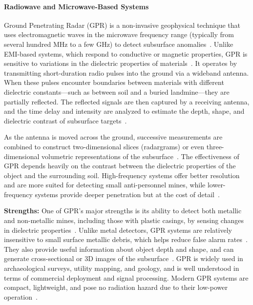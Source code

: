 
\paragraph{Radiowave and Microwave-Based Systems}

Ground Penetrating Radar (GPR) is a non-invasive geophysical technique that uses electromagnetic waves in the microwave frequency range (typically from several hundred MHz to a few GHz) to detect subsurface anomalies~\cite{gichd2006guidebook}. Unlike EMI-based systems, which respond to conductive or magnetic properties, GPR is sensitive to variations in the dielectric properties of materials~\cite{Gooneratne2004ARO}. It operates by transmitting short-duration radio pulses into the ground via a wideband antenna. When these pulses encounter boundaries between materials with different dielectric constants—such as between soil and a buried landmine—they are partially reflected. The reflected signals are then captured by a receiving antenna, and the time delay and intensity are analyzed to estimate the depth, shape, and dielectric contrast of subsurface targets~\cite{alqudsi2021review, paik2002image}.

As the antenna is moved across the ground, successive measurements are combined to construct two-dimensional slices (radargrams) or even three-dimensional volumetric representations of the subsurface~\cite{Bruschini1997ASO}. The effectiveness of GPR depends heavily on the contrast between the dielectric properties of the object and the surrounding soil. High-frequency systems offer better resolution and are more suited for detecting small anti-personnel mines, while lower-frequency systems provide deeper penetration but at the cost of detail~\cite{gichd2006guidebook}.

\textbf{Strengths:} One of GPR’s major strengths is its ability to detect both metallic and non-metallic mines, including those with plastic casings, by sensing changes in dielectric properties~\cite{Gooneratne2004ARO}. Unlike metal detectors, GPR systems are relatively insensitive to small surface metallic debris, which helps reduce false alarm rates~\cite{gichd2006guidebook}. They also provide useful information about object depth and shape, and can generate cross-sectional or 3D images of the subsurface~\cite{Bruschini1997ASO}. GPR is widely used in archaeological surveys, utility mapping, and geology, and is well understood in terms of commercial deployment and signal processing. Modern GPR systems are compact, lightweight, and pose no radiation hazard due to their low-power operation~\cite{gichd2006guidebook}.

